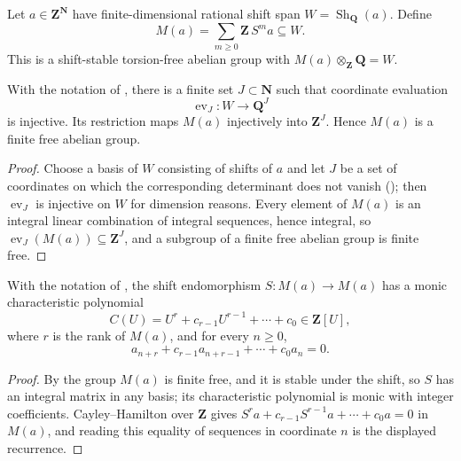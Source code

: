 \begin{definition}
\label{def:zla-integral-shift-lattice}
\leanok
Let $a\in\mathbf Z^{\mathbf N}$ have finite-dimensional rational shift span
$W=\operatorname{Sh}_{\mathbf Q}(a)$.  Define
\[
  M(a)=\sum_{m\geq0}\mathbf Z\,S^ma\subseteq W.
\]
This is a shift-stable torsion-free abelian group with
$M(a)\otimes_{\mathbf Z}\mathbf Q=W$.
\end{definition}

\begin{lemma}
\label{lem:zla-finite-coordinate-lattice}
\leanok
With the notation of , there is a finite
set $J\subset\mathbf N$ such that coordinate evaluation
\[
  \operatorname{ev}_J:W\longrightarrow\mathbf Q^J
\]
is injective.  Its restriction maps $M(a)$ injectively into $\mathbf Z^J$.
Hence $M(a)$ is a finite free abelian group.
\end{lemma}
\begin{proof}
\leanok
Choose a basis of $W$ consisting of shifts of $a$ and let $J$ be a set of
coordinates on which the corresponding determinant does not vanish
(); then $\operatorname{ev}_J$ is injective on
$W$ for dimension reasons.  Every element of $M(a)$ is an integral linear
combination of integral sequences, hence integral, so
$\operatorname{ev}_J(M(a))\subseteq\mathbf Z^J$, and a subgroup of a finite
free abelian group is finite free.
\end{proof}

\begin{lemma}
\label{lem:zla-integral-cayley-hamilton}
\leanok
With the notation of , the shift
endomorphism $S:M(a)\to M(a)$ has a monic characteristic polynomial
\[
  C(U)=U^r+c_{r-1}U^{r-1}+\cdots+c_0\in\mathbf Z[U],
\]
where $r$ is the rank of $M(a)$, and for every $n\geq0$,
\[
  a_{n+r}+c_{r-1}a_{n+r-1}+\cdots+c_0a_n=0.
\]
\end{lemma}
\begin{proof}
\leanok
By  the group $M(a)$ is finite free, and
it is stable under the shift, so $S$ has an integral matrix in any basis; its
characteristic polynomial is monic with integer coefficients.
Cayley--Hamilton over $\mathbf Z$ gives
$S^ra+c_{r-1}S^{r-1}a+\cdots+c_0a=0$ in $M(a)$, and reading this equality of
sequences in coordinate $n$ is the displayed recurrence.
\end{proof}

